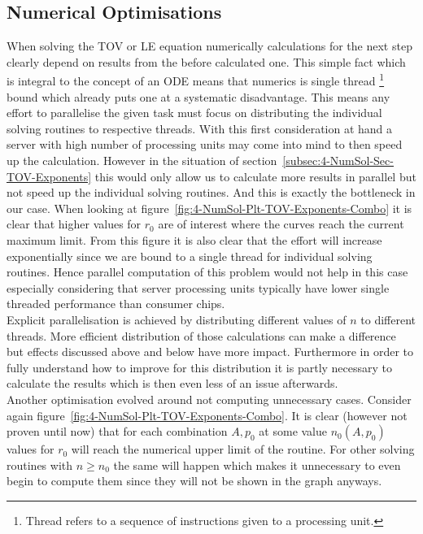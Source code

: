 \subsection{Numerical Optimisations}
\label{subsec:99-App-Numerical-Optimisations}
When solving the \ac{TOV} or \ac{LE} equation numerically calculations for the next step clearly depend on results from the before calculated one.
This simple fact which is integral to the concept of an \ac{ODE} means that numerics is single thread \footnote{Thread refers to a sequence of instructions given to a processing unit.} bound which already puts one at a systematic disadvantage.
This means any effort to parallelise the given task must focus on distributing the individual solving routines to respective threads.
With this first consideration at hand a server with high number of processing units may come into mind to then speed up the calculation.
However in the situation of section~\ref{subsec:4-NumSol-Sec-TOV-Exponents} this would only allow us to calculate more results in parallel but not speed up the individual solving routines.
And this is exactly the bottleneck in our case.
When looking at figure~\ref{fig:4-NumSol-Plt-TOV-Exponents-Combo} it is clear that higher values for $r_0$ are of interest where the curves reach the current maximum limit.
From this figure it is also clear that the effort will increase exponentially since we are bound to a single thread for individual solving routines.
Hence parallel computation of this problem would not help in this case especially considering that server processing units typically have lower single threaded performance than consumer chips.\\
Explicit parallelisation is achieved by distributing different values of $n$ to different threads.
More efficient distribution of those calculations can make a difference but effects discussed above and below have more impact.
Furthermore in order to fully understand how to improve for this distribution it is partly necessary to calculate the results which is then even less of an issue afterwards.\\
Another optimisation evolved around not computing unnecessary cases.
Consider again figure~\ref{fig:4-NumSol-Plt-TOV-Exponents-Combo}.
It is clear (however not proven until now) that for each combination $A,p_0$ at some value $n_0(A,p_0)$ values for $r_0$ will reach the numerical upper limit of the routine.
For other solving routines with $n\geq n_0$ the same will happen which makes it unnecessary to even begin to compute them since they will not be shown in the graph anyways.
